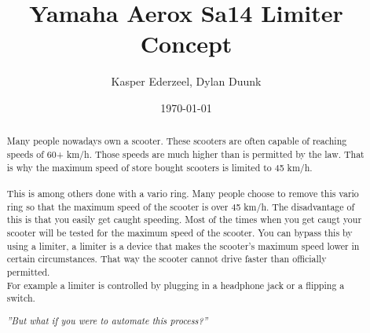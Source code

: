 \documentclass[a4paper]{article}
\title{ \Huge{Yamaha Aerox Sa14 Limiter Concept} }
\author{Kasper Ederzeel, Dylan Duunk}
\date{\today}
\begin{document}
\begin{titlepage}
    \maketitle
\end{titlepage}    


\newpage

\begin{abstract}
    \noindent
    Many people nowadays own a scooter.
    These scooters are often capable of reaching speeds of 60+ km/h.
    Those speeds are much higher than is permitted by the law.
    That is why the maximum speed of store bought scooters is limited to 45 km/h.
    \\ \\
    This is among others done with a vario ring.
    Many people choose to remove this vario ring so that the maximum speed of the scooter is over 45 km/h.
    The disadvantage of this is that you easily get caught speeding.
    Most of the times when you get caugt your scooter will be tested for the maximum speed of the scooter.
    You can bypass this by using a limiter, a limiter is a device that makes the scooter's maximum speed lower in certain circumstances.
    That way the scooter cannot drive faster than officially permitted.
    \\
    For example a limiter is controlled by plugging in a headphone jack or a flipping a switch. 

    \vspace{7px}
    \begin{center}
        \textit{''But what if you were to automate this process?''}
    \end{center}
\end{abstract}

\newpage
\tableofcontents
\newpage
{}

\nocite{*}
\end{document}
